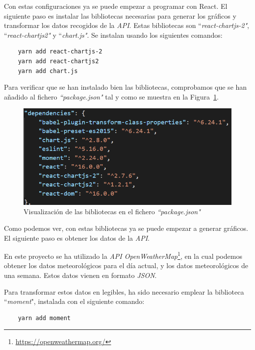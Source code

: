 \documentclass[a4paper, 12pt]{book}
\begin{document}
Con estas configuraciones ya se puede empezar a programar con React. El siguiente paso es instalar las bibliotecas necesarias para generar los gráficos y transformar los datos recogidos de la \textit{API}. Estas bibliotecas son ``\textit{react-chartjs-2"}, ``\textit{react-chartjs2"} y ``\textit{chart.js"}. Se instalan usando los siguientes comandos: 
\begin{verbatim}
    yarn add react-chartjs-2
    yarn add react-chartjs2
    yarn add chart.js
\end{verbatim} 
Para verificar que se han instalado bien las bibliotecas, comprobamos que se han añadido al fichero \textit{``package.json"} tal y como se muestra en la Figura~\ref{fig:package_chart}.
\begin{figure}[h]
  \centering
  \includegraphics{img_usadas/package_chart.png}
  \caption{Visualización de las bibliotecas en el fichero \textit{``package.json"}}
  \label{fig:package_chart}
\end{figure}

Como podemos ver, con estas bibliotecas ya se puede empezar a generar gráficos. El siguiente paso es obtener los datos de la \textit{API}. 

En este proyecto se ha utilizado la \textit{API OpenWeatherMap}\footnote{\url{https://openweathermap.org/}}, en la cual podemos obtener los datos meteorológicos para el día actual, y los datos meteorológicos de una semana.
Estos datos vienen en formato \textit{JSON}.

\vspace{5mm}
Para transformar estos datos en legibles, ha sido necesario emplear la biblioteca ``\textit{moment}", instalada con el siguiente comando: 
\begin{verbatim}
    yarn add moment
\end{verbatim} 
\end{document}

